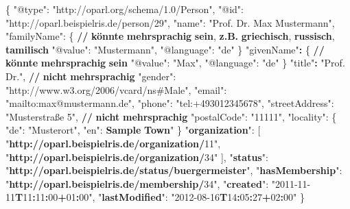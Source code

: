 \documentclass[,a4paper]{article}
\newenvironment{Shaded}{}{}
\newcommand{\DataTypeTok}[1]{\textcolor[rgb]{0.56,0.13,0.00}{{#1}}}
\newcommand{\DecValTok}[1]{\textcolor[rgb]{0.25,0.63,0.44}{{#1}}}
\newcommand{\StringTok}[1]{\textcolor[rgb]{0.25,0.44,0.63}{{#1}}}
\newcommand{\ErrorTok}[1]{\textcolor[rgb]{1.00,0.00,0.00}{\textbf{{#1}}}}
\newcommand{\NormalTok}[1]{{#1}}
\begin{document}
\begin{Shaded}
\begin{Highlighting}[]
\NormalTok{\{}
    \DataTypeTok{"@type"}\NormalTok{: }\StringTok{"http://oparl.org/schema/1.0/Person"}\NormalTok{,}
    \DataTypeTok{"@id"}\NormalTok{: }\StringTok{"http://oparl.beispielris.de/person/29"}\NormalTok{,}
    \DataTypeTok{"name"}\NormalTok{: }\StringTok{"Prof. Dr. Max Mustermann"}\NormalTok{,}
    \DataTypeTok{"familyName"}\NormalTok{: \{ }\ErrorTok{//} \ErrorTok{könnte} \ErrorTok{mehrsprachig} \ErrorTok{sein}\NormalTok{, }\ErrorTok{z.B.} \ErrorTok{griechisch}\NormalTok{, }\ErrorTok{russisch}\NormalTok{, }\ErrorTok{tamilisch} 
        \DataTypeTok{"@value"}\NormalTok{: }\StringTok{"Mustermann"}\NormalTok{,}
        \DataTypeTok{"@language"}\NormalTok{: }\StringTok{"de"}
    \NormalTok{\}}
    \StringTok{"givenName"}\ErrorTok{:} \NormalTok{\{ }\ErrorTok{//} \ErrorTok{könnte} \ErrorTok{mehrsprachig} \ErrorTok{sein}
        \DataTypeTok{"@value"}\NormalTok{: }\StringTok{"Max"}\NormalTok{,}
        \DataTypeTok{"@language"}\NormalTok{: }\StringTok{"de"}
    \NormalTok{\}}
    \StringTok{"title"}\ErrorTok{:} \StringTok{"Prof. Dr."}\NormalTok{, }\ErrorTok{//} \ErrorTok{nicht} \ErrorTok{mehrsprachig}
    \DataTypeTok{"gender"}\NormalTok{: }\StringTok{"http://www.w3.org/2006/vcard/ns#Male"}\NormalTok{,}
    \DataTypeTok{"email"}\NormalTok{: }\StringTok{"mailto:max@mustermann.de"}\NormalTok{,}
    \DataTypeTok{"phone"}\NormalTok{: }\StringTok{"tel:+493012345678"}\NormalTok{,}
    \DataTypeTok{"streetAddress"}\NormalTok{: }\StringTok{"Musterstraße 5"}\NormalTok{, }\ErrorTok{//} \ErrorTok{nicht} \ErrorTok{mehrsprachig}
    \DataTypeTok{"postalCode"}\NormalTok{: }\StringTok{"11111"}\NormalTok{,}
    \DataTypeTok{"locality"}\NormalTok{: \{}
        \DataTypeTok{"de"}\NormalTok{: }\StringTok{"Musterort"}\NormalTok{,}
        \DataTypeTok{"en"}\NormalTok{: }\ErrorTok{Sample} \ErrorTok{Town}\StringTok{"}
\StringTok{    \}}
\StringTok{    "}\ErrorTok{organization}\StringTok{": [}
\StringTok{        "}\ErrorTok{http://oparl.beispielris.de/organization/}\DecValTok{11}\StringTok{",}
\StringTok{        "}\ErrorTok{http://oparl.beispielris.de/organization/}\DecValTok{34}\StringTok{"}
\StringTok{    ],}
\StringTok{    "}\ErrorTok{status}\StringTok{": "}\ErrorTok{http://oparl.beispielris.de/status/buergermeister}\StringTok{",}
\StringTok{    "}\ErrorTok{hasMembership}\StringTok{": "}\ErrorTok{http://oparl.beispielris.de/membership/}\DecValTok{34}\StringTok{",}
\StringTok{    "}\ErrorTok{created}\StringTok{": "}\DecValTok{2011-11-11}\ErrorTok{T}\DecValTok{11}\ErrorTok{:}\DecValTok{11}\ErrorTok{:}\DecValTok{00}\ErrorTok{+}\DecValTok{01}\ErrorTok{:}\DecValTok{00}\StringTok{",}
\StringTok{    "}\ErrorTok{lastModified}\StringTok{": "}\DecValTok{2012-08-16}\ErrorTok{T}\DecValTok{14}\ErrorTok{:}\DecValTok{05}\ErrorTok{:}\DecValTok{27}\ErrorTok{+}\DecValTok{02}\ErrorTok{:}\DecValTok{00}\StringTok{"}
\StringTok{\}}
\end{Highlighting}
\end{Shaded}
\end{document}

